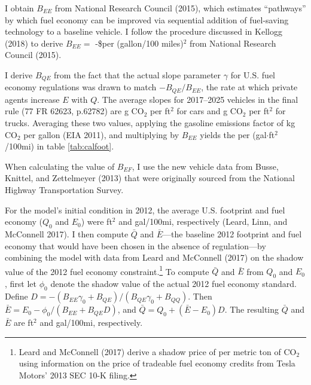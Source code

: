 \documentclass[12pt]{article}
\begin{document}
I obtain $B_{EE}$ from National Research Council (2015), which estimates ``pathways'' by which fuel economy can be improved via sequential addition of fuel-saving technology to a baseline vehicle. I follow the procedure discussed in Kellogg (2018) to derive $B_{EE}=$ -\$per (gallon/100 miles)$^2$ from National Research Council (2015). 

I derive $B_{QE}$ from the fact that the actual slope parameter $\gamma$ for U.S. fuel economy regulations was drawn to match $-B_{QE}/B_{EE}$, the rate at which private agents increase $E$ with $Q$. The average slopes for 2017--2025 vehicles in the final rule (77 FR 62623, p.62782) are \unskip g CO$_2$ per ft$^2$ for cars and \unskip g CO$_2$ per ft$^2$ for trucks. Averaging these two values, applying the gasoline emissions factor of kg CO$_2$ per gallon (EIA 2011), and multiplying by $B_{EE}$ yields the per (gal$\cdot$ft$^2$/100mi) in table \ref{tab:calfoot}.

When calculating the value of $B_{EF}$, I use the new vehicle data from Busse, Knittel, and Zettelmeyer (2013) that were originally sourced from the National Highway Transportation Survey.

For the model's initial condition in 2012, the average U.S. footprint and fuel economy ($Q_0$ and $E_0$) were ft$^2$ and gal/100mi, respectively (Leard, Linn, and McConnell 2017). I then compute $\bar{Q}$ and $\bar{E}$---the baseline 2012 footprint and fuel economy that would have been chosen in the absence of regulation---by combining the model with data from Leard and McConnell (2017) on the shadow value of the 2012 fuel economy constraint.\footnote{Leard and McConnell (2017) derive a shadow price of per metric ton of CO$_2$ using information on the price of tradeable fuel economy credits from Tesla Motors' 2013 SEC 10-K filing.} To compute  $\bar{Q}$ and $\bar{E}$ from $Q_0$ and $E_0$, first let $\phi_0$ denote the shadow value of the actual 2012 fuel economy standard. Define $D=-(B_{EE}\gamma_0+B_{QE})/(B_{QE}\gamma_0+B_{QQ})$. Then $\bar{E}=E_0-\phi_0/(B_{EE}+B_{QE}D)$, and $\bar{Q}=Q_0 +(\bar{E}-E_0)D$. The resulting $\bar{Q}$ and $\bar{E}$ are ft$^2$ and gal/100mi, respectively.
\end{document}
